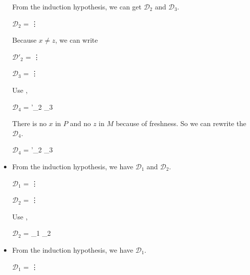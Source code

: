 \begin{itemize}
	      From the induction hypothesis, we can get $\mathcal{D}_2$ and $\mathcal{D}_3$.
	      	      	      	      
	      $\mathcal{D}_2$ = 
	      {\vdots}
	      	      	      	      
	      Because $x \neq z$, we can write
	      	      	      	      
	      $\mathcal{D}'_2$ = 
	      {\vdots}
	      	      	      	      
	      $\mathcal{D}_3$ = 
	      {\vdots}
	      	      	      	      
	      Use \KApp,
	      	      	      	      
	      $\mathcal{D}_4$ = 
	      {'_2 \andalso {}_3}
	      	      	      	      
	      There is no $x$ in $P$ and no $z$ in $M$ because of freshness. So we can rewrite the $\mathcal{D}_4$.
	      	      	      	      
	      $\mathcal{D}_4$ = 
	      {'_2 \andalso {}_3}
	      	      	      	      
	\item \KConv
	      	      	      	      
	      From the induction hypothesis, we have $\mathcal{D}_1$ and $\mathcal{D}_2$.
	      	      	      	      
	      $\mathcal{D}_1$ = 
	      {\vdots}
	      	      	      	      
	      $\mathcal{D}_2$ = 
	      {\vdots}
	      	      	      	      
	      Use \KConv,
	      	      	      	      
	      $\mathcal{D}_2$ = 
	      {_1 \andalso {}_2}
	      	      	      	      
	\item \KTW
	      	      	      	      
	      From the induction hypothesis, we have $\mathcal{D}_1$.
	      	      	      	      
	      $\mathcal{D}_1$ = 
	      {\vdots}
	      	      	      	      

\end{itemize}
